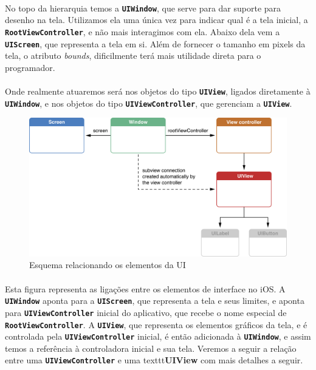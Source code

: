 \documentclass[a4paper,12pt,brazil,doubleside]{book}
\begin{document}
\paragraph{}No topo da hierarquia temos a \texttt{\textbf{UIWindow}}, que serve para dar suporte para desenho na tela. Utilizamos ela uma única vez para indicar qual é a tela inicial, a \texttt{\textbf{RootViewController}}, e não mais interagimos com ela. Abaixo dela vem a \texttt{\textbf{UIScreen}}, que representa a tela em si. Além de fornecer o tamanho em pixels da tela, o atributo \emph{bounds}, dificilmente terá mais utilidade direta para o programador.
\paragraph{}Onde realmente atuaremos será nos objetos do tipo \texttt{\textbf{UIView}}, ligados diretamente à \texttt{\textbf{UIWindow}}, e nos objetos do tipo \texttt{\textbf{UIViewController}}, que gerenciam a \texttt{\textbf{UIView}}.

\bigskip
\bigskip

\begin{figure}[h]
  \centering
  \includegraphics[totalheight=0.35\textheight]{figuras/apple_window_view_controller_screen.png}
  \caption{Esquema relacionando os elementos da UI}
  \label{fig:a}
\end{figure}

\bigskip

\paragraph{}Esta figura representa as ligações entre os elementos de interface no iOS. A \texttt{\textbf{UIWindow}} aponta para a \texttt{\textbf{UIScreen}}, que representa a tela e seus limites, e aponta para \texttt{\textbf{UIViewController}} inicial do aplicativo, que recebe o nome especial de \texttt{\textbf{RootViewController}}. A \texttt{\textbf{UIView}}, que representa os elementos gráficos da tela, e é controlada pela \texttt{\textbf{UIViewController}} inicial, é então adicionada à \texttt{\textbf{UIWindow}}, e assim temos a referência à controladora inicial e sua tela. Veremos a seguir a relação entre uma \texttt{\textbf{UIViewController}} e uma texttt{\textbf{UIView}} com mais detalhes a seguir.
\end{document}
